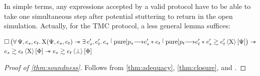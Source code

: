 In simple terms, any expressions accepted by a valid protocol have to be able to take one simultaneous step after potential stuttering to return in the open simulation.
Actually, for the TMC protocol, a less general lemma suffices:

\begin{lemma} \label{thm:closure}
    \begin{align*}
            &
            \iPersistent \left(
                \forall \iPredTwo, \datalangExpr_s, \datalangExpr_t \ldotp
                \iProt (\iPredTwo, \datalangExpr_s, \datalangExpr_t) \iWand
                \exists \datalangExpr_s', \datalangExpr_t' \ldotp
                \datalangExpr_s \pureStep{\datalangProg_s} \datalangExpr_s' \iSep
                \datalangExpr_t \pureStep{\datalangProg_t} \datalangExpr_t' \iSep
                \iSim[\iProt]{\iPredTwo}{\datalangExpr_s'}{\datalangExpr_t'}
            \right) \iWand
        \\
            &
            \iSim[\iProt]{\iPred}{\datalangExpr_s}{\datalangExpr_t} \iWand
            \iSim[\bot]{\iPred}{\datalangExpr_s}{\datalangExpr_t}
    \end{align*}
\end{lemma}

\begin{proof}[Proof of \cref{thm:soundness}]
    Follows from \cref{thm:adequacy}, \cref{thm:closure},  and .
\end{proof}

